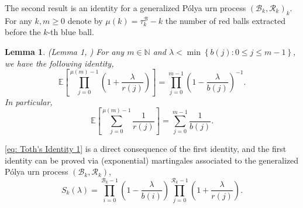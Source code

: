 \documentclass[twoside,12pt, a4paper]{article}
\newtheorem{lemma}{Lemma}[section]
\numberwithin{equation}{section}
\theoremstyle{remark}
\begin{document}
	
	
	The second result is an identity for a generalized P\'{o}lya urn process $(\mathcal{B}_{k},\mathcal{R}_{k})_k$. For any $k,m\geq 0$ denote by $\mu(k)= \tau^{\mathcal{B}}_k - k$ the number of red balls extracted before the $k$-th blue ball. 
	\begin{lemma}(Lemma 1, \cite{T96}) \label{lm: Toth's Identity}
		For any $m\in \mathbb{N}$ and $\lambda < \min\left\{ b(j): 0\leq j\leq m-1 \right\}$, we have the following identity,
		$$  \mathbb{E}\left[  \prod_{j=0}^{ \mu(m)-1 } \left(1+ \frac{\lambda}{r(j)}   \right) \right] =   \prod_{j=0}^{ m-1 } \left(1- \frac{\lambda}{b(j)}   \right)^{-1}.   $$ 
		In particular, 
		\begin{equation}\label{eq: Toth's Identity 1}
			\mathbb{E}\left[  \sum_{j=0}^{ \mu(m)-1 } \frac{1}{r(j)}   \right] =   \sum_{j=0}^{ m-1 } \frac{1}{b(j)}.
		\end{equation}	
	\end{lemma}
	\eqref{eq: Toth's Identity 1} is a direct consequence of the first identity, and the first identity can be proved via (exponential) martingales associated to the generalized P\'{o}lya urn process $(\mathcal{B}_{k},\mathcal{R}_{k})$, 
	\[
	S_k(\lambda) = \prod_{i=0}^{ \mathcal{B}_{k}-1 } \left(1-\frac{\lambda}{b(i)}\right) \prod_{j=0}^{\mathcal{R}_{k}-1 } \left(1+\frac{\lambda}{r(j)}\right)
	.\]
	
\end{document}
